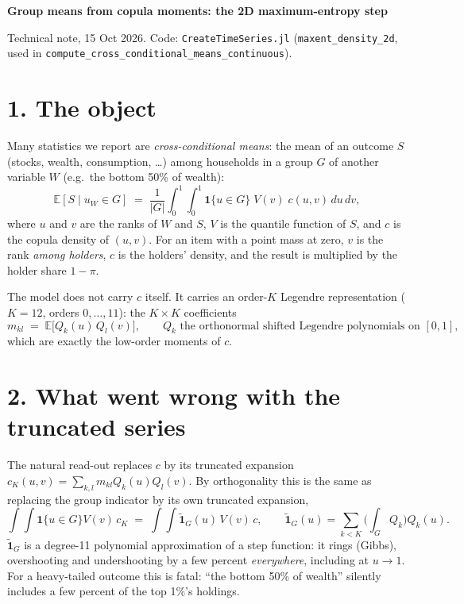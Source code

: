 \documentclass[11pt]{article}
\newcommand{\E}{\mathbb{E}}
\begin{document}
{\Large\bfseries Group means from copula moments: the 2D maximum-entropy step}\par\smallskip
{\small Technical note, 15 Oct 2026. Code: \texttt{CreateTimeSeries.jl} (\texttt{maxent\_density\_2d}, used in \texttt{compute\_cross\_conditional\_means\_continuous}).}

\section*{1. The object}
Many statistics we report are \emph{cross-conditional means}: the mean of an outcome $S$ (stocks, wealth, consumption, \dots) among households in a group $G$ of another variable $W$ (e.g.\ the bottom 50\% of wealth):
\[
\E[S \mid u_W \in G] \;=\; \frac{1}{|G|}\int_0^1\!\!\int_0^1 \mathbf 1\{u\in G\}\; V(v)\; c(u,v)\,du\,dv ,
\]
where $u$ and $v$ are the ranks of $W$ and $S$, $V$ is the quantile function of $S$, and $c$ is the copula density of $(u,v)$. For an item with a point mass at zero, $v$ is the rank \emph{among holders}, $c$ is the holders' density, and the result is multiplied by the holder share $1-\pi$.

The model does not carry $c$ itself. It carries an order-$K$ Legendre representation ($K=12$, orders $0,\dots,11$): the $K\times K$ coefficients
\[
m_{kl} \;=\; \E\big[Q_k(u)\,Q_l(v)\big], \qquad Q_k \text{ the orthonormal shifted Legendre polynomials on } [0,1],
\]
which are exactly the low-order moments of $c$.

\section*{2. What went wrong with the truncated series}
The natural read-out replaces $c$ by its truncated expansion $c_K(u,v)=\sum_{k,l} m_{kl}Q_k(u)Q_l(v)$. By orthogonality this is the same as replacing the group indicator by its own truncated expansion,
\[
\textstyle \int\!\!\int \mathbf 1\{u\in G\}V(v)\,c_K \;=\; \int\!\!\int \tilde{\mathbf 1}_G(u)\,V(v)\,c, \qquad \tilde{\mathbf 1}_G(u)=\sum_{k<K} \Big(\int_G Q_k\Big) Q_k(u).
\]
$\tilde{\mathbf 1}_G$ is a degree-11 polynomial approximation of a step function: it rings (Gibbs), overshooting and undershooting by a few percent \emph{everywhere}, including at $u\to 1$. For a heavy-tailed outcome this is fatal: ``the bottom 50\% of wealth'' silently includes a few percent of the top 1\%'s holdings.
\end{document}
